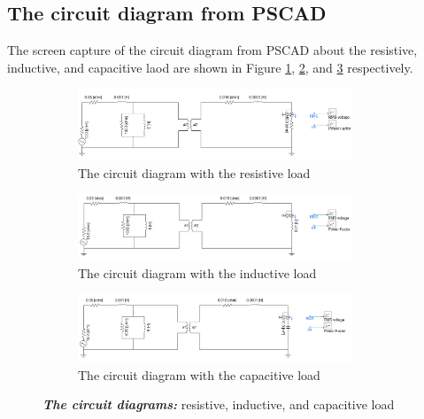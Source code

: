 \documentclass[12pt]{report} %
\begin{document}
\subsection{The circuit diagram from PSCAD}
The screen capture of the circuit diagram from PSCAD about the resistive, inductive, and capacitive laod 
are shown in Figure \ref{fig:Q2circuit_sub1}, \ref{fig:Q2circuit_sub2}, and \ref{fig:Q2circuit_sub3} respectively. 
\begin{figure}[H]
    \centering %
    \begin{subfigure}[b]{\textwidth}
        \centering
        \includegraphics[width=0.9\textwidth]{Image/Q2/Q2_resistor_circuit.PNG}
        \caption{The circuit diagram with the resistive load}
        \label{fig:Q2circuit_sub1}
    \end{subfigure}
    \hfill
    \centering %
    \begin{subfigure}[b]{\textwidth}
        \centering
        \includegraphics[width=0.9\textwidth]{Image/Q2/Q2_inductor_circuit.PNG}
        \caption{The circuit diagram with the inductive load}
        \label{fig:Q2circuit_sub2}
    \end{subfigure} 
    \hfill
    \centering %
    \begin{subfigure}[b]{\textwidth}
        \centering
        \includegraphics[width=0.9\textwidth]{Image/Q2/Q2_capacitor_circuit.PNG}
        \caption{The circuit diagram with the capacitive load}
        \label{fig:Q2circuit_sub3}
    \end{subfigure} 
    \caption[The circuit diagrams of the different loads]
    {\centering \textit{\textbf{The circuit diagrams:}} resistive, inductive, and capacitive load}
    \label{fig:Q2circuitdiagram}
\end{figure}
\newpage
\end{document}
